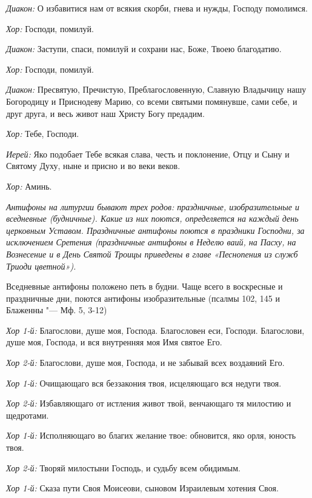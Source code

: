 \begin{mymulticols}
{\itshape Диакон:} О избавитися нам от всякия скорби, гнева и нужды, Господу помолимся. 

{\itshape Хор:} Господи, помилуй.

{\itshape Диакон:} Заступи, спаси, помилуй и сохрани нас, Боже, Твоею благодатию. 

{\itshape Хор:} Господи, помилуй.

{\itshape Диакон:} Пресвятую, Пречистую, Преблагословенную, Славную Владычицу нашу Богородицу и Приснодеву Марию, со всеми святыми помянувше, сами себе, и друг друга, и весь живот наш Христу Богу предадим. 

{\itshape Хор:} Тебе, Господи. 

{\itshape Иерей:} Яко подобает Тебе всякая слава, честь и поклонение, Отцу и Сыну и Святому Духу, ныне и присно и во веки веков. 

{\itshape Хор:} Аминь.


{\itshape Антифоны на литургии бывают трех родов: праздничные, изобразительные и вседневные (будничные). Какие из них поются, определяется на каждый день церковным Уставом. Праздничные антифоны поются в праздники Господни, за исключением Сретения (праздничные антифоны в Неделю ваий, на Пасху, на Вознесение и в День Святой Троицы приведены в главе «Песнопения из служб Триоди цветной»).

Вседневные антифоны положено петь в будни. Чаще всего в воскресные и праздничные дни, поются антифоны изобразительные (псалмы 102, 145 и Блаженны "--- Мф. 5, 3-12)}


{\itshape Хор 1-й:} Благослови, душе моя, Господа. Благословен еси, Господи. Благослови, душе моя, Господа, и вся внутренняя моя Имя святое Его. 

{\itshape Хор 2-й:} Благослови, душе моя, Господа, и не забывай всех воздаяний Его. 

{\itshape Хор 1-й:} Очищающаго вся беззакония твоя,  исцеляющаго вся недуги твоя. 

{\itshape Хор 2-й:} Избавляющаго от истления живот твой,  венчающаго тя милостию и щедротами. 

{\itshape Хор 1-й:} Исполняющаго во благих желание твое:  обновится, яко орля, юность твоя. 

{\itshape Хор 2-й:} Творяй милостыни Господь, и судьбу всем обидимым. 

{\itshape Хор 1-й:} Сказа пути Своя Моисеови, сыновом Израилевым хотения Своя. 


\end{mymulticols}
